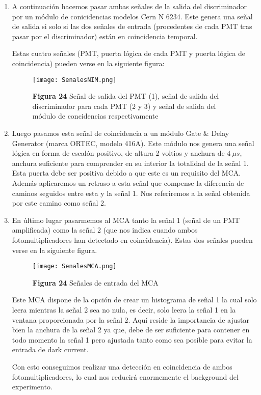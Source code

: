 \begin{enumerate}
\item{} A continuación hacemos pasar ambas señales de la salida del discriminador por un módulo de conicidencias modelos Cern N 6234. Este genera una señal de salida si solo si las dos señales de entrada (procedentes de cada PMT tras pasar por el discriminador) están en coincidencia temporal. 

Estas cuatro señales (PMT, puerta lógica de cada PMT y puerta lógica de coincidencia) pueden verse en la siguiente figura:

\begin{figure}[hbtp]
\centering
\texttt{[image: SenalesNIM.png]}
\caption{\textbf{Figura 24} Señal de salida del PMT (1), señal de salida del discriminador para cada PMT (2 y 3) y señal de salida del módulo de concidencias respectivamente}
\end{figure}


\item {} Luego pasamos esta señal de coincidencia a un módulo Gate \& Delay Generator (marca ORTEC, modelo 416A). Este módulo nos genera una señal lógica en forma de escalón positivo, de altura 2 voltios y anchura de $4~\mu s$, anchura suficiente para comprender en su interior la totalidad de la señal 1. Esta puerta debe ser positiva debido a que este es un requisito del MCA. Además aplicaremos un retraso a esta señal que compense la diferencia de caminos seguidos entre esta y la señal 1. Nos referiremos a la señal obtenida por este camino como señal 2.

\item {} En último lugar pasarmemos al MCA tanto la señal 1 (señal de un PMT amplificada) como la señal 2 (que nos indica cuando ambos fotomultiplicadores han detectado en coincidencia). Estas dos señales pueden verse en la siguiente figura.

\begin{figure}[hbtp]
\centering
\texttt{[image: SenalesMCA.png]}
\caption{\textbf{Figura 24} Señales de entrada del MCA}
\end{figure}


Este MCA dispone de la opción de crear un histograma de señal 1 la cual solo leera mientras la señal 2 sea no nula, es decir, solo leera la señal 1 en la ventana proporcionada por la señal 2. Aquí reside la importancia de ajustar bien la anchura de la señal 2 ya que, debe de ser suficiente para contener en todo momento la señal 1 pero ajustada tanto como sea posible para evitar la entrada de dark current.

Con esto conseguimos realizar una detección en coincidencia de ambos fotomultiplicadores, lo cual nos reducirá enormemente el background del experimento.

\end{enumerate}



